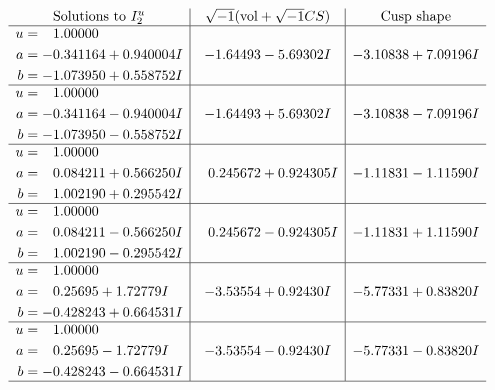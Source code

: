 \documentclass[1p]{elsarticle_modified}
\theoremstyle{definition}
\newcommand{\I}{\sqrt{-1}}
\begin{document}
$$\begin{array}{c|c|c}  
\text{Solutions to }I^u_{2}& \I (\text{vol} + \sqrt{-1}CS) & \text{Cusp shape}\\
 \hline 
\begin{aligned}
u &= \phantom{-}1.00000\phantom{ +0.000000I} \\
a &= -0.341164 + 0.940004 I \\
b &= -1.073950 + 0.558752 I\end{aligned}
 & -1.64493 - 5.69302 I & -3.10838 + 7.09196 I \\ \hline\begin{aligned}
u &= \phantom{-}1.00000\phantom{ +0.000000I} \\
a &= -0.341164 - 0.940004 I \\
b &= -1.073950 - 0.558752 I\end{aligned}
 & -1.64493 + 5.69302 I & -3.10838 - 7.09196 I \\ \hline\begin{aligned}
u &= \phantom{-}1.00000\phantom{ +0.000000I} \\
a &= \phantom{-}0.084211 + 0.566250 I \\
b &= \phantom{-}1.002190 + 0.295542 I\end{aligned}
 & \phantom{-}0.245672 + 0.924305 I & -1.11831 - 1.11590 I \\ \hline\begin{aligned}
u &= \phantom{-}1.00000\phantom{ +0.000000I} \\
a &= \phantom{-}0.084211 - 0.566250 I \\
b &= \phantom{-}1.002190 - 0.295542 I\end{aligned}
 & \phantom{-}0.245672 - 0.924305 I & -1.11831 + 1.11590 I \\ \hline\begin{aligned}
u &= \phantom{-}1.00000\phantom{ +0.000000I} \\
a &= \phantom{-}0.25695 + 1.72779 I \\
b &= -0.428243 + 0.664531 I\end{aligned}
 & -3.53554 + 0.92430 I & -5.77331 + 0.83820 I \\ \hline\begin{aligned}
u &= \phantom{-}1.00000\phantom{ +0.000000I} \\
a &= \phantom{-}0.25695 - 1.72779 I \\
b &= -0.428243 - 0.664531 I\end{aligned}
 & -3.53554 - 0.92430 I & -5.77331 - 0.83820 I\\
 \hline 
 \end{array}$$\newpage\newpage\renewcommand{\arraystretch}{1}
\end{document}
